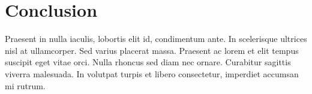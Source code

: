 \section{Conclusion}
Praesent in nulla iaculis, lobortis elit id, condimentum
ante. In scelerisque ultrices nisl at ullamcorper. Sed varius placerat massa.
Praesent ac lorem et elit tempus suscipit eget vitae orci. Nulla rhoncus sed
diam nec ornare. Curabitur sagittis viverra malesuada. In volutpat turpis et
libero consectetur, imperdiet accumsan mi rutrum.
